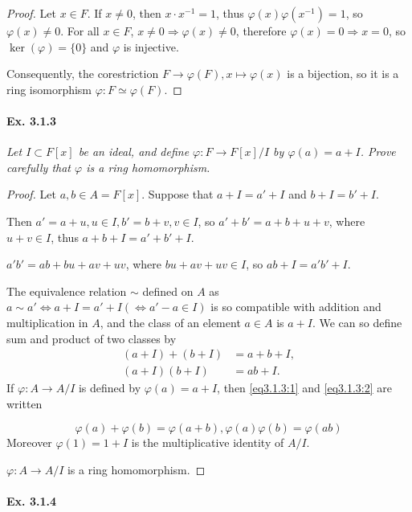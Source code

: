 \documentclass[11pt,a4paper]{article}
\begin{document}
\begin{proof}
Let $x \in F$. If $x\ne 0$, then $x\cdot x^{-1} = 1$, thus $\varphi(x) \varphi(x^{-1}) = 1$, so $\varphi(x) \ne 0$.
For all $x\in F$, $x \ne 0 \Rightarrow \varphi(x) \ne 0$, therefore $\varphi(x) = 0 \Rightarrow x =0$, so $\ker(\varphi) = \{0\}$ and $\varphi$ is injective.

Consequently, the corestriction $F \to \varphi(F), x \mapsto \varphi(x)$ is a bijection, so it is a ring isomorphism $\varphi : F \simeq \varphi(F)$.
\end{proof}

\paragraph{Ex. 3.1.3}

{\it Let $I \subset F[x]$ be an ideal, and define $\varphi : F \to F[x]/I$ by $\varphi(a) = a + I$. Prove carefully that $\varphi$ is a ring homomorphism.
}

\begin{proof}
Let $a,b \in A = F[x]$. Suppose that $a+I = a'+I$ and $b+I = b'+I$.

Then $a' =a + u, u \in I, b' = b+v, v\in I$, so $a'+b' = a+b + u+v$, where $u+v \in I$, thus $a+b+I = a'+b'+I$.

$a'b' = ab+ bu+av + uv$, where $bu+av + uv \in I$, so $ab+ I = a'b'+I$.

The equivalence relation $\sim$ defined on $A$ as $a \sim a' \iff a+ I = a'+ I (\iff a' - a \in I)$ is so compatible with addition and multiplication in $A$, and the class of an element $a \in A$ is $a+I$. We can so define sum and product of two classes by
\begin{align}
(a+I) +(b+I) &= a+b+I,  \label{eq3.1.3:1}\\
(a+I) (b+I) &= ab+I.\label{eq3.1.3:2}
\end{align}
If $\varphi : A \to A/I$ is defined by $\varphi(a) = a+I$, then \eqref{eq3.1.3:1} and \eqref{eq3.1.3:2} are written

$$\varphi(a)+ \varphi(b) = \varphi(a+b) , \varphi(a) \varphi(b) = \varphi(ab)$$
Moreover $\varphi(1) = 1+I$ is the multiplicative identity of $A/I$.

$\varphi : A \to A/I$ is a ring homomorphism. 
\end{proof}

\paragraph{Ex. 3.1.4}
\end{document}
